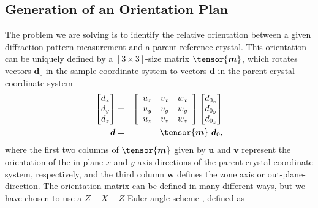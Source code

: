 \documentclass[%
 superscriptaddress,
 aip,
 amsmath,amssymb,
reprint,%
 author-year,%
longbibliography
]{revtex4-2}
\begin{document}
\subsection*{Generation of an Orientation Plan}

The problem we are solving is to identify the relative orientation between a given diffraction pattern measurement and a parent reference crystal. This orientation can be uniquely defined by a $[3 \times 3]$-size matrix $\tensor{\bm{m}}$, which rotates vectors $\bm{d}_0$ in the sample coordinate system to vectors $\bm{d}$ in the parent crystal coordinate system
\begin{eqnarray}
    \begin{bmatrix}
       d_x \\
       d_y \\
       d_z
    \end{bmatrix}
    &=& 
    \left[
      \begin{array}{ccc}
        u_x & v_x & w_x \\
        u_y & v_y & w_y \\
        u_z & v_z & w_z  \\  
      \end{array}
    \right]
    \begin{bmatrix}
       d_{0_x} \\
       d_{0_y} \\
       d_{0_z}
    \end{bmatrix}
    \nonumber \\
    \bm{d} 
    &=& 
    \tensor{\bm{m}}
    \ \bm{d}_0,
\end{eqnarray}
where the first two columns of $\tensor{\bm{m}}$ given by $\bm{u}$ and $\bm{v}$ represent the orientation of the in-plane $x$ and $y$ axis directions of the parent crystal coordinate system, respectively, and the third column $\bm{w}$ defines the zone axis or out-plane-direction. The orientation matrix can be defined in many different ways, but we have chosen to use a $Z-X-Z$ Euler angle scheme \citep{rowenhorst2015consistent}, defined as
\end{document}
